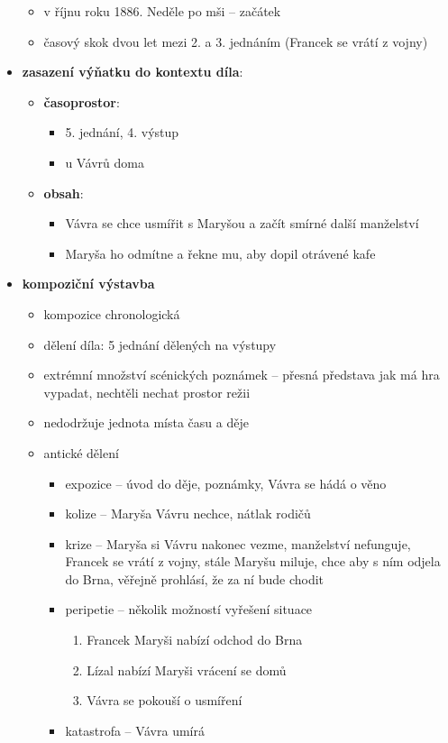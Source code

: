 \documentclass[10pt,a4paper]{article}
\begin{document}
\begin{itemize}
\begin{itemize}
\begin{itemize}
		\end{itemize}
	\item v říjnu roku 1886. Neděle po mši -- začátek
	\item časový skok dvou let mezi 2. a 3. jednáním (Francek se vrátí z vojny)
	\end{itemize}
\item \textbf{zasazení výňatku do kontextu díla}:
	\begin{itemize}
	\item \textbf{časoprostor}:
		\begin{itemize}
		\item 5. jednání, 4. výstup
		\item u Vávrů doma
		\end{itemize}
	\item \textbf{obsah}: 
		\begin{itemize}
		\item Vávra se chce usmířit s Maryšou a začít smírné další manželství
		\item Maryša ho odmítne a řekne mu, aby dopil otrávené kafe
		\end{itemize}
	\end{itemize}
\item \textbf{kompoziční výstavba}
	\begin{itemize}
	\item kompozice chronologická
	\item dělení díla: 5 jednání dělených na výstupy
	\item extrémní množství scénických poznámek -- přesná představa jak má hra vypadat, nechtěli nechat prostor režii
	\item nedodržuje jednota místa času a děje
	\item antické dělení
		\begin{itemize}
		\item expozice -- úvod do děje, poznámky, Vávra se hádá o věno
		\item kolize -- Maryša Vávru nechce, nátlak rodičů
		\item krize -- Maryša si Vávru nakonec vezme, manželství nefunguje, Francek se vrátí z vojny, stále Maryšu miluje, chce aby s ním odjela do Brna, věřejně prohlásí, že za ní bude chodit
		\item peripetie -- několik možností vyřešení situace
			\begin{enumerate}
			\item Francek Maryši nabízí odchod do Brna
			\item Lízal nabízí Maryši vrácení se domů
			\item Vávra se pokouší o usmíření
			\end{enumerate}
		\item katastrofa -- Vávra umírá
		\end{itemize}
	\end{itemize}
\end{itemize}
\end{document}
